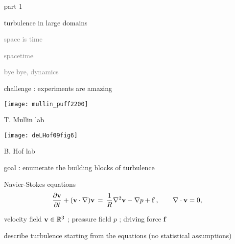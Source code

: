 \begin{frame}{part 1}
\begin{enumerate}
              \item {\Large
turbulence in large domains
                  }\textcolor{gray}{\small
              \item
space is time
              \item
spacetime
              \item
bye bye, dynamics
                    }
            \end{enumerate}
\end{frame}

\begin{frame}{challenge : experiments are amazing}
\begin{center}
\texttt{[image: mullin\_puff2200]} %
\end{center}
T. Mullin lab
\begin{center}
\bigskip
\texttt{[image: deLHof09fig6]} %
\end{center}
B. Hof lab
\end{frame}

\begin{frame}{goal : enumerate the building blocks of turbulence}
\begin{block}{Navier-Stokes equations} %
\[
\dfrac{\partial {\bf v}}{\partial t} + ({\bf v} \cdot \nabla) {\bf v}
	\,=\,
\frac{1}{R} \nabla ^2 {\bf v}
-\nabla p
+ \mathbf{f}
    \,,\qquad
\nabla \cdot {\bf v} = 0,
\]
\end{block}

\hfill{\small
velocity field  ${\bf v} \in \mathbb{R}^3$
;
pressure field $p$
;
driving force $\mathbf{f}$
        }

\medskip

\begin{block}{describe turbulence}
starting from the equations (no statistical assumptions)
\end{block}

\bigskip

\hfill {\Large\textcolor{red}{}}

\end{frame}

